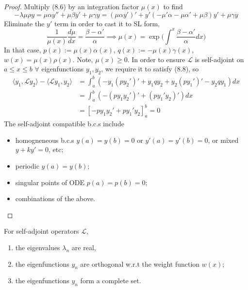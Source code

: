 \documentclass[a4paper]{article}
\begin{document}
\begin{proof}
Multiply (8.6) by an integration factor $\mu(x)$ to find
$$-\lambda\mu\rho y=\mu\alpha y''+\mu\beta y'+\mu\gamma y=(\mu\alpha y')'+y'(-\mu'\alpha-\mu\alpha'+\mu\beta)y'+\mu\gamma y$$
Eliminate the $y'$ term in order to cast it to SL form,
\begin{equation}
\frac{1}{\mu(x)}\frac{d\mu}{dx}=\frac{\beta-\alpha'}{\alpha}\implies\mu(x)=\exp\bigg(\int^x\frac{\beta-\alpha'}{\alpha}dx\bigg)\tag{8.10}
\end{equation}
In that case, $p(x):=\mu(x)\alpha(x)$, $q(x):=-\mu(x)\gamma(x)$, $w(x)=\mu(x)\rho(x)$. Note, $\mu(x)\geq0$. In order to ensure $\mathcal{L}$ is self-adjoint on $a\leq x\leq b$ $\forall$ eigenfunctions $y_1,y_2$, we require it to satisfy (8.8), so
\begin{align}
\langle y_1,\mathcal{L}y_2\rangle-\langle\mathcal{L}y_1,y_2\rangle&=\int_a^b(-y_1(p y_2')'+y_1qy_2+y_2(py_1')'-y_2qy_1)dx\nonumber\\&=\int_a^b(-(p y_1y_2')'+(p y_1'y_2)')dx\nonumber\\&=[-p y_1y_2'+p y_1'y_2]_a^b=0\tag{8.11}
\end{align}
The self-adjoint compatible b.c.s include
\begin{itemize}
    \item homogneneous b.c.s $y(a)=y(b)=0$ or $y'(a)=y'(b)=0$, or mixed $y+ky'=0$, etc;
    \item periodic $y(a)=y(b)$;
    \item singular points of ODE $p(a)=p(b)=0$;
    \item combinations of the above.
\end{itemize}
\end{proof}
\begin{thm}
For self-adjoint operators $\mathcal{L}$,
\begin{enumerate}
    \item the eigenvalues $\lambda_n$ are real,
    \item the eigenfunctions $y_n$ are orthogonal w.r.t the weight function $w(x)$;
    \item  the eigenfunctions $y_n$ form a complete set.
\end{enumerate}
\end{thm}
\end{document}

